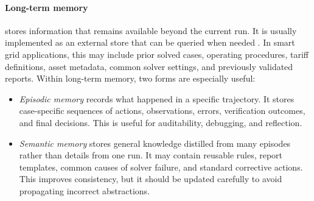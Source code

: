 \documentclass[journal,onecolumn]{IEEEtran} %
\begin{document}
\paragraph{Long-term memory} stores information that remains available beyond the current run. It is usually implemented as an external store that can be queried when needed \cite{park2023generative,packer2023memgpt}. In smart grid applications, this may include prior solved cases, operating procedures, tariff definitions, asset metadata, common solver settings, and previously validated reports. Within long-term memory, two forms are especially useful:
    \begin{itemize}
        \item \textit{Episodic memory} records what happened in a specific trajectory. It stores case-specific sequences of actions, observations, errors, verification outcomes, and final decisions. This is useful for auditability, debugging, and reflection. \cite{park2023generative}
        \item \textit{Semantic memory} stores general knowledge distilled from many episodes rather than details from one run. It may contain reusable rules, report templates, common causes of solver failure, and standard corrective actions. This improves consistency, but it should be updated carefully to avoid propagating incorrect abstractions.
    \end{itemize}

\end{document}
